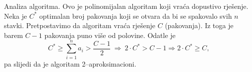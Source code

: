 \documentclass[a4paper, utf8, 11pt, colorlinks]{article}
\begin{document}
\noindent Analiza algoritma. Ovo je polinomijalan algoritam koji vraća dopustivo rješenje.  Neka je $C^*$ optimalan broj pakovanja koji se otvara da bi se spakovalo svih $n$ stavki. Pretpostavimo da algoritam vraća rješenje $C$ (pakovanja). Iz toga je barem $C-1$ pakovanja puno više od polovine. Odatle je
$$C^* \geq \sum_{i=1}^n a_i > \frac{C-1}{2}\ \Rightarrow\  2 \cdot C^* > C-1 \Rightarrow 2 \cdot C^* \geq C,$$
pa slijedi da je algoritam 2--aproksimacioni. 

\end{document}
